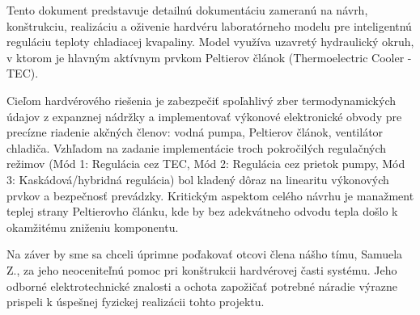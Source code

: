 Tento dokument predstavuje detailnú dokumentáciu zameranú na návrh, konštrukciu,
realizáciu a oživenie hardvéru laboratórneho modelu pre inteligentnú reguláciu teploty
chladiacej kvapaliny. 
Model využíva uzavretý hydraulický okruh, v ktorom je hlavným
aktívnym prvkom Peltierov článok (Thermoelectric Cooler - TEC).

Cieľom hardvérového riešenia je zabezpečiť spoľahlivý zber termodynamických údajov
z expanznej nádržky a implementovať výkonové elektronické obvody pre precízne riadenie
akčných členov: vodná pumpa, Peltierov článok, ventilátor chladiča. 
Vzhľadom na zadanie implementácie troch pokročilých regulačných režimov (Mód 1: Regulácia cez TEC, Mód 2:
Regulácia cez prietok pumpy, Mód 3: Kaskádová/hybridná regulácia) bol kladený dôraz na
linearitu výkonových prvkov a bezpečnosť prevádzky. Kritickým aspektom celého návrhu
je manažment teplej strany Peltierovho článku, kde by bez adekvátneho odvodu tepla
došlo k okamžitému zniženiu komponentu.

Na záver by sme sa chceli úprimne poďakovať otcovi člena nášho tímu, Samuela Z., za jeho neoceniteľnú pomoc pri konštrukcii hardvérovej časti systému. 
Jeho odborné elektrotechnické znalosti a ochota zapožičať potrebné náradie výrazne prispeli k úspešnej fyzickej realizácii tohto projektu.